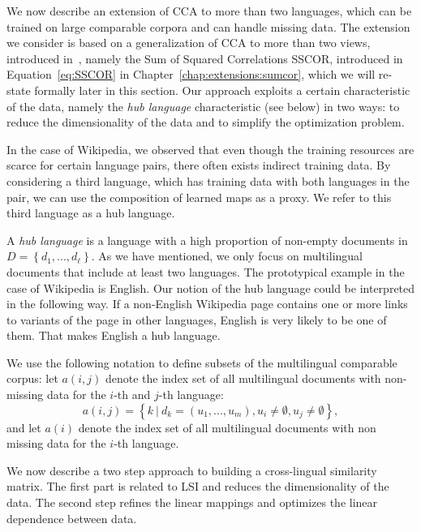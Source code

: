 We now describe an extension of CCA to more than two languages, which can be trained on
large comparable corpora and can handle missing data. The extension we consider is based on
a generalization of CCA to more than two views, introduced in~\cite{Kettenring}, namely
the Sum of Squared Correlations SSCOR, introduced in Equation~\ref{eq:SSCOR} in
Chapter~\ref{chap:extensions:sumcor}, which we will re-state formally later in this section.
Our approach exploits a certain characteristic of the data, namely the \emph{hub language}
characteristic (see below) in two ways: to reduce the dimensionality of the data and to
simplify the optimization problem.

In the case of Wikipedia, we observed that even though the training resources are scarce
for certain language pairs, there often exists indirect training data. By considering
a third language, which has training data with both languages in the pair,  we can use
the composition of learned maps as a proxy. We refer to this third language as a hub language.

A \emph{hub language} is a language with a high proportion of non-empty documents in
$D = \left\{d_1,..., d_{\ell}\right\}$. As we have mentioned, we only focus on multilingual
documents that include at least two languages. The prototypical example in the case of
Wikipedia is English. Our notion of the hub language could be interpreted in the following
way. If a non-English Wikipedia page contains one or more links to variants of the page in
other languages, English is very likely to be one of them. That makes English a hub language.

We use the following notation to define subsets of the multilingual comparable corpus:
let $a(i,j)$ denote the index set of all multilingual documents with non-missing data
for the $i$-th and $j$-th language:
$$a(i,j) = \left\{k~ |~ d_k = (u_1,...,u_m), u_i \neq \emptyset, u_j \neq \emptyset \right\},$$
and let $a(i)$ denote the index set of all multilingual documents with non missing data
for the $i$-th language.

We now describe a two step approach to building a cross-lingual similarity matrix.
The first part is related to LSI and reduces the dimensionality of the data. The second
step refines the linear mappings and optimizes the linear dependence between data.

